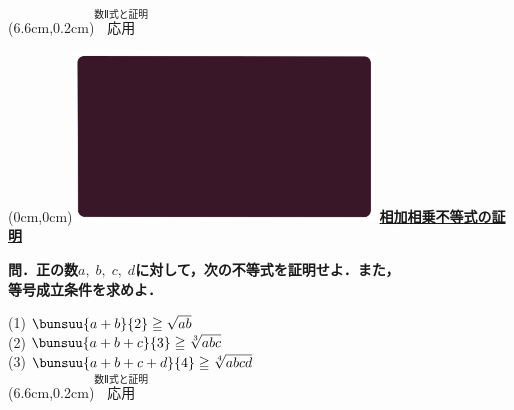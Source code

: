 \documentclass[10pt,
fleqn,
dvipdfmx,
uplatex
]{jsarticle}
\begin{document}
\at(6.6cm,0.2cm){\small\color{bradorange}$\overset{\text{数Ⅱ式と証明}}{\text{応用}}$}


\newpage



\at(0cm,0cm){\includegraphics[width=8cm,bb=0 0 1920 1080]{./youtube/thumbnails/templates/smart_background/数II式と証明.jpeg}}
{\color{orange}\bf\boldmath\LARGE\underline{相加相乗不等式の証明}}\vspace{0.1zw}

\scriptsize 
\bf\boldmath 問．正の数$a,\;b,\;c,\;d$に対して，次の不等式を証明せよ．また，\\
\hfill 等号成立条件を求めよ．

\normalsize
\vspace{-1zw}
(1)  $\bunsuu{{a+b}}{2}\geqq \sqrt {ab}$\vspace{0.1zw}\\
\large
(2)  $\bunsuu{{a+b+c}}{3}\geqq \sqrt[3]{abc}$\vspace{0.1zw}\\
\Large
(3)  $\bunsuu{{a+b+c+d}}{4}\geqq \sqrt[4]{abcd}$\\

\at(6.6cm,0.2cm){\small\color{bradorange}$\overset{\text{数Ⅱ式と証明}}{\text{応用}}$}
\end{document}
